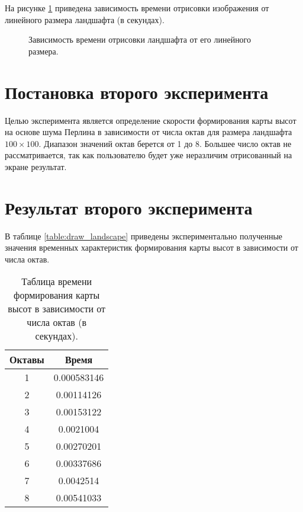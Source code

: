 На рисунке \ref{fg:ref1} приведена зависимость времени отрисовки изображения от линейного размера ландшафта (в секундах).

\begin{figure}[H]
	\centering
	\captionsetup{justification=centering}
	\caption{Зависимость времени отрисовки ландшафта от его линейного размера.} 
	\label{fg:ref1}
\end{figure} 


\section{Постановка второго эксперимента} 
Целью эксперимента является определение скорости формирования карты высот на основе шума Перлина в зависимости от числа октав для размера ландшафта $100\times100$. Диапазон значений октав берется от 1 до 8. Большее число октав не рассматривается, так как пользователю будет уже неразличим отрисованный на экране результат.

\section{Результат второго эксперимента}
В таблице \ref{table:draw_landscape} приведены экспериментально полученные значения временных характеристик формирования карты высот в зависимости от числа октав.

\begin{table}[ht!]
	\centering
	\captionsetup{singlelinecheck = false, justification=raggedright}
	\caption{Таблица времени формирования карты высот в зависимости от числа октав (в секундах).}
	\label{table:octaves}
	\begin{tabular}{|c|c|}
		\hline
		Октавы & Время \\ \hline
		1 & 0.000583146 \\ \hline
		2 & 0.00114126 \\ \hline
		3 & 0.00153122 \\ \hline
		4 & 0.0021004 \\ \hline
		5 & 0.00270201 \\ \hline
		6 & 0.00337686 \\ \hline
		7 & 0.0042514 \\\hline
		8 & 0.00541033 \\\hline
	\end{tabular}
\end{table} 

